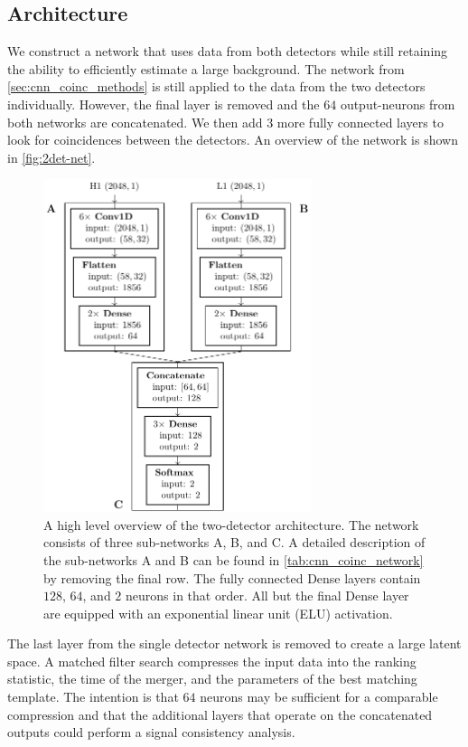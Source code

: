 \subsection{Architecture}
We construct a network that uses data from both detectors while still retaining the ability to efficiently estimate a large background. The network from \autoref{sec:cnn_coinc_methods} is still applied to the data from the two detectors individually. However, the final layer is removed and the $64$ output-neurons from both networks are concatenated. We then add $3$ more fully connected layers to look for coincidences between the detectors. An overview of the network is shown in \autoref{fig:2det-net}.

\begin{figure}
    \centering
    \includegraphics[width=0.7\textwidth]{chapters/cnn_coinc/images/2det-net.pdf}
    \caption[Coincidence network architecture]{A high level overview of the two-detector architecture. The network consists of three sub-networks A, B, and C. A detailed description of the sub-networks A and B can be found in \autoref{tab:cnn_coinc_network} by removing the final row. The fully connected Dense layers contain $128$, $64$, and $2$ neurons in that order. All but the final Dense layer are equipped with an exponential linear unit (ELU) activation.}
    \label{fig:2det-net}
\end{figure}

The last layer from the single detector network is removed to create a large latent space. A matched filter search compresses the input data into the ranking statistic, the time of the merger, and the parameters of the best matching template. The intention is that $64$ neurons may be sufficient for a comparable compression and that the additional layers that operate on the concatenated outputs could perform a signal consistency analysis.


